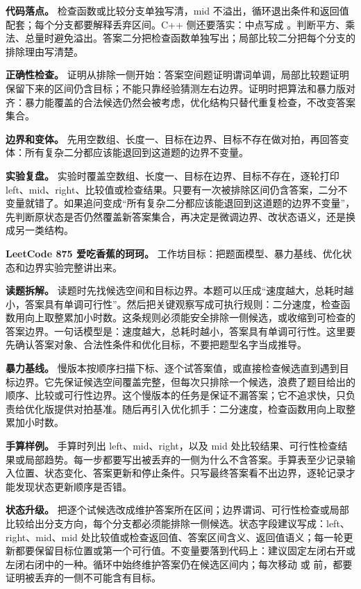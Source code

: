 \textbf{代码落点。} 检查函数或比较分支单独写清，mid 不溢出，循环退出条件和返回值配套；每个分支都要解释丢弃区间。C++ 侧还要落实：中点写成 。判断平方、乘法、总量时避免溢出。答案二分把检查函数单独写出；局部比较二分把每个分支的排除理由写清楚。

\textbf{正确性检查。} 证明从排除一侧开始：答案空间题证明谓词单调，局部比较题证明保留下来的区间仍含目标；不能只靠经验猜测左右边界。证明时把算法和暴力版对齐：暴力能覆盖的合法候选仍然会被考虑，优化结构只替代重复检查，不改变答案集合。

\textbf{边界和变体。} 先用空数组、长度一、目标在边界、目标不存在做对拍，再回答变体：所有复杂二分都应该能退回到这道题的边界不变量。

\textbf{实验复盘。} 实验时覆盖空数组、长度一、目标在边界、目标不存在，逐轮打印 left、mid、right、比较值或检查结果。只要有一次被排除区间仍含答案，二分不变量就错了。如果追问变成“所有复杂二分都应该能退回到这道题的边界不变量”，先判断原状态是否仍然覆盖新答案集合，再决定是微调边界、改状态语义，还是换成另一类结构。

\noindent\textbf{LeetCode 875 爱吃香蕉的珂珂。} 工作坊目标：把题面模型、暴力基线、优化状态和边界实验完整讲出来。

\textbf{读题拆解。} 读题时先找候选空间和目标边界。本题可以压成“速度越大，总耗时越小，答案具有单调可行性”。然后把关键观察写成可执行规则：二分速度，检查函数用向上取整累加小时数。这条规则必须能安全排除一侧候选，或收缩到可检查的答案边界。一句话模型是：速度越大，总耗时越小，答案具有单调可行性。这里要先确认答案对象、合法性条件和优化目标，不要把题型名字当成推导。

\textbf{暴力基线。} 慢版本按顺序扫描下标、逐个试答案值，或直接检查候选直到遇到目标边界。它先保证候选空间覆盖完整，但每次只排除一个候选，浪费了题目给出的顺序、比较或可行性边界。这个慢版本的任务是保证不漏答案；它不追求快，只负责给优化版提供对拍基准。随后再引入优化抓手：二分速度，检查函数用向上取整累加小时数。

\textbf{手算样例。} 手算时列出 left、mid、right，以及 mid 处比较结果、可行性检查结果或局部趋势。每一步都要写出被丢弃的一侧为什么不含答案。手算表至少记录输入位置、状态变化、答案更新和停止条件。只写最终答案看不出边界，逐轮记录才能发现状态更新顺序是否错。

\textbf{状态升级。} 把逐个试候选改成维护答案所在区间；边界谓词、可行性检查或局部比较给出分支方向，每个分支都必须能排除一侧候选。状态字段建议写成：left、right、mid、mid 处比较值或检查返回值、答案区间含义、返回值语义；每一轮更新都要保留目标位置或第一个可行值。不变量要落到代码上：建议固定左闭右开或左闭右闭中的一种。循环中始终维护答案仍在候选区间内；每次移动  或  前，都要证明被丢弃的一侧不可能含有目标。

